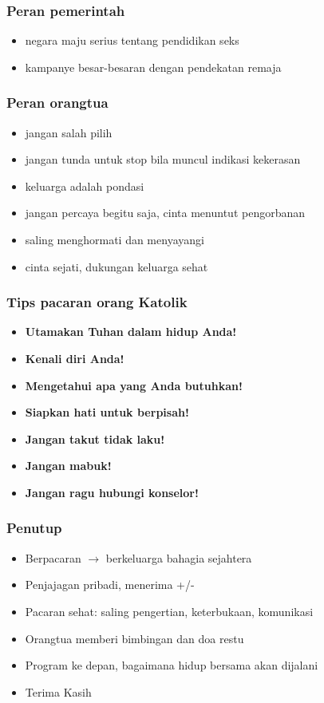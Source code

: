 \documentclass[12pt,a4paper]{beamer}
\begin{document}
\begin{frame}
\frametitle{Peran pemerintah}
\begin{itemize}[<+->]
\item negara maju serius tentang pendidikan seks
\item kampanye besar-besaran dengan pendekatan remaja
\end{itemize}

\end{frame}

\begin{frame}
\frametitle{Peran orangtua}
\begin{itemize}[<+->]
\item jangan salah pilih
\item jangan tunda untuk stop bila muncul indikasi kekerasan
\item keluarga adalah pondasi
\item jangan percaya begitu saja, cinta menuntut pengorbanan
\item saling menghormati dan menyayangi
\item cinta sejati, dukungan keluarga sehat
\end{itemize}
\end{frame}

\begin{frame}
\frametitle{Tips pacaran orang Katolik}
\begin{itemize}[<+->]
\item \textbf{Utamakan Tuhan dalam hidup Anda!}
\item  \textbf{Kenali diri Anda!} 
\item  \textbf{Mengetahui apa yang Anda butuhkan!} 
\item  \textbf{Siapkan hati untuk berpisah!}
\item  \textbf{Jangan takut tidak laku!}
\item \textbf{Jangan mabuk!}
\item \textbf{Jangan ragu hubungi konselor!}
\end{itemize}

\end{frame}

\begin{frame}
\frametitle{Penutup}
\begin{itemize}[<+->]
\item Berpacaran $\rightarrow$ berkeluarga bahagia sejahtera
\item Penjajagan pribadi, menerima +/-  
\item Pacaran sehat: saling pengertian, keterbukaan, komunikasi
\item Orangtua memberi bimbingan dan doa restu
\item Program ke depan, bagaimana hidup bersama akan dijalani
\item {\Large Terima Kasih}
\end{itemize}
\end{frame}
\end{document}
